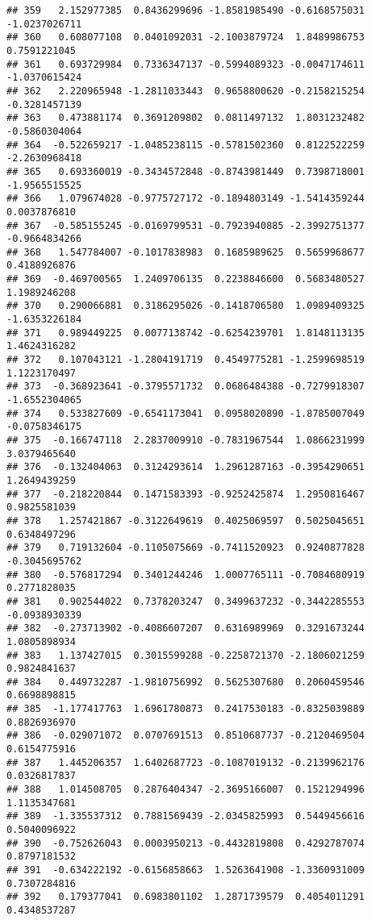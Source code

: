 \documentclass[
]{article}
\begin{document}
\begin{verbatim}
## 359   2.152977385  0.8436299696 -1.8581985490 -0.6168575031 -1.0237026711
## 360   0.608077108  0.0401092031 -2.1003879724  1.8489986753  0.7591221045
## 361   0.693729984  0.7336347137 -0.5994089323 -0.0047174611 -1.0370615424
## 362   2.220965948 -1.2811033443  0.9658800620 -0.2158215254 -0.3281457139
## 363   0.473881174  0.3691209802  0.0811497132  1.8031232482 -0.5860304064
## 364  -0.522659217 -1.0485238115 -0.5781502360  0.8122522259 -2.2630968418
## 365   0.693360019 -0.3434572848 -0.8743981449  0.7398718001 -1.9565515525
## 366   1.079674028 -0.9775727172 -0.1894803149 -1.5414359244  0.0037876810
## 367  -0.585155245 -0.0169799531 -0.7923940885 -2.3992751377 -0.9664834266
## 368   1.547784007 -0.1017838983  0.1685989625  0.5659968677  0.4188926876
## 369  -0.469700565  1.2409706135  0.2238846600  0.5683480527  1.1989246208
## 370   0.290066881  0.3186295026 -0.1418706580  1.0989409325 -1.6353226184
## 371   0.989449225  0.0077138742 -0.6254239701  1.8148113135  1.4624316282
## 372   0.107043121 -1.2804191719  0.4549775281 -1.2599698519  1.1223170497
## 373  -0.368923641 -0.3795571732  0.0686484388 -0.7279918307 -1.6552304065
## 374   0.533827609 -0.6541173041  0.0958020890 -1.8785007049 -0.0758346175
## 375  -0.166747118  2.2837009910 -0.7831967544  1.0866231999  3.0379465640
## 376  -0.132404063  0.3124293614  1.2961287163 -0.3954290651  1.2649439259
## 377  -0.218220844  0.1471583393 -0.9252425874  1.2950816467  0.9825581039
## 378   1.257421867 -0.3122649619  0.4025069597  0.5025045651  0.6348497296
## 379   0.719132604 -0.1105075669 -0.7411520923  0.9240877828 -0.3045695762
## 380  -0.576817294  0.3401244246  1.0007765111 -0.7084680919  0.2771828035
## 381   0.902544022  0.7378203247  0.3499637232 -0.3442285553 -0.0938930339
## 382  -0.273713902 -0.4086607207  0.6316989969  0.3291673244  1.0805898934
## 383   1.137427015  0.3015599288 -0.2258721370 -2.1806021259  0.9824841637
## 384   0.449732287 -1.9810756992  0.5625307680  0.2060459546  0.6698898815
## 385  -1.177417763  1.6961780873  0.2417530183 -0.8325039889  0.8826936970
## 386  -0.029071072  0.0707691513  0.8510687737 -0.2120469504  0.6154775916
## 387   1.445206357  1.6402687723 -0.1087019132 -0.2139962176  0.0326817837
## 388   1.014508705  0.2876404347 -2.3695166007  0.1521294996  1.1135347681
## 389  -1.335537312  0.7881569439 -2.0345825993  0.5449456616  0.5040096922
## 390  -0.752626043  0.0003950213 -0.4432819808  0.4292787074  0.8797181532
## 391  -0.634222192 -0.6156858663  1.5263641908 -1.3360931009  0.7307284816
## 392   0.179377041  0.6983801102  1.2871739579  0.4054011291  0.4348537287

\end{verbatim}
\end{document}
